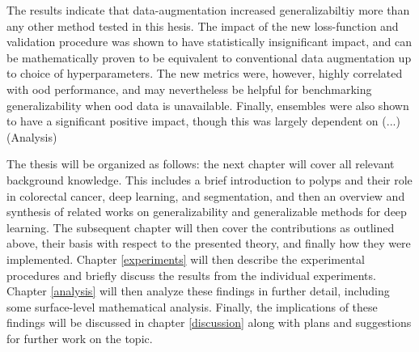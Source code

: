    The results indicate that data-augmentation increased generalizabiltiy more than any other method tested in this hesis. The impact of the new loss-function and validation procedure was shown to have statistically insignificant impact, and can be mathematically proven to be equivalent to conventional data augmentation up to choice of hyperparameters. The new metrics were, however, highly correlated with \gls{ood} performance, and may nevertheless be helpful for benchmarking generalizability when \gls{ood} data is unavailable. Finally, ensembles were also shown to have a significant positive impact, though this was largely dependent on (...)  
    (Analysis)

    The thesis will be organized as follows: the next chapter will cover all relevant background knowledge. This includes a brief introduction to polyps and their role in colorectal cancer, deep learning, and segmentation, and then an overview and synthesis of related works on generalizability and generalizable methods for deep learning. The subsequent chapter will then cover the contributions as outlined above, their basis with respect to the presented theory, and finally how they were implemented. Chapter \ref{experiments} will then describe the experimental procedures and briefly discuss the results from the individual experiments. Chapter \ref{analysis} will then analyze these findings in further detail, including some surface-level mathematical analysis. Finally, the implications of these findings will be discussed in chapter \ref{discussion} along with plans and suggestions for further work on the topic. 